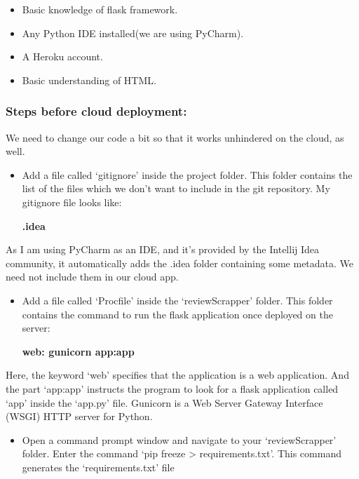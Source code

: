\documentclass[11pt]{article}
\providecommand{\tightlist}{%
      \setlength{\itemsep}{0pt}\setlength{\parskip}{0pt}}
\begin{document}
\begin{itemize}
\tightlist
\item
  Basic knowledge of flask framework.
\item
  Any Python IDE installed(we are using PyCharm).
\item
  A Heroku account.
\item
  Basic understanding of HTML.
\end{itemize}

    \subsubsection{Steps before cloud
deployment:}\label{steps-before-cloud-deployment}

We need to change our code a bit so that it works unhindered on the
cloud, as well.

\begin{itemize}
\item
  Add a file called `gitignore' inside the project folder. This folder
  contains the list of the files which we don't want to include in the
  git repository. My gitignore file looks like:

  \textbf{.idea}
\end{itemize}

As I am using PyCharm as an IDE, and it's provided by the Intellij Idea
community, it automatically adds the .idea folder containing some
metadata. We need not include them in our cloud app.

\begin{itemize}
\item
  Add a file called `Procfile' inside the `reviewScrapper' folder. This
  folder contains the command to run the flask application once deployed
  on the server:

  \textbf{web: gunicorn app:app}
\end{itemize}

Here, the keyword `web' specifies that the application is a web
application. And the part `app:app' instructs the program to look for a
flask application called `app' inside the `app.py' file. Gunicorn is a
Web Server Gateway Interface (WSGI) HTTP server for Python.

\begin{itemize}
\tightlist
\item
  Open a command prompt window and navigate to your `reviewScrapper'
  folder. Enter the command `pip freeze \textgreater{}
  requirements.txt'. This command generates the `requirements.txt' file
\end{itemize}
\end{document}
